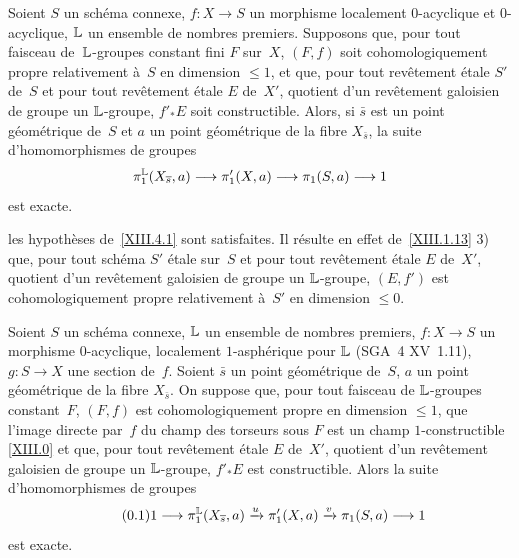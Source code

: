 \begin{lemme}
\label{XIII.4.2}
Soient $S$ un sch\'ema connexe, $f\colon X\to S$ un morphisme
localement $0$-acyclique et $0$-acyclique, $\mathbb{L}$ un ensemble de
nombres premiers. Supposons
que, pour tout faisceau de~$\mathbb{L}$-groupes constant fini $F$ sur~$X$,
$(F,f)$ soit cohomologiquement propre relativement \`a~$S$ en
dimension $\leqslant1$, et que, pour tout rev\^etement \'etale
$S'$ de~$S$ et pour tout rev\^etement \'etale $E$ de~$X'$,
quotient d'un rev\^etement galoisien de groupe un $\mathbb{L}$-groupe,
$f'_*E$ soit constructible. Alors, si $\bar{s}$ est un point
g\'eom\'etrique de~$S$ et $a$ un point g\'eom\'etrique de la
fibre $X_{\bar{s}}$, la suite d'homomorphismes de groupes
$$
\pi_1^{\LL}(X_{\bar{s}},a)\to\pi_1'(X,a)\to\pi_1(S,a)\to1
$$
est exacte.
\end{lemme}

les hypoth\`eses de~\ref{XIII.4.1} sont satisfaites. Il r\'esulte
en effet de~\ref{XIII.1.13} 3) que, pour tout sch\'ema $S'$
\'etale sur~$S$ et pour tout rev\^etement \'etale $E$ de~$X'$,
quotient d'un rev\^etement galoisien de groupe un $\mathbb{L}$-groupe,
$(E,f')$ est cohomologiquement propre relativement \`a~$S'$ en
dimension $\leqslant 0$.
\begin{proposition}
\label{XIII.4.3}
Soient $S$ un sch\'ema connexe, $\mathbb{L}$ un ensemble de nombres
premiers, $f\colon X\to S$ un morphisme $0$-acyclique, localement
$1$-asph\'erique pour $\mathbb{L}$ \textup{(SGA~4 XV~1.11)}, $g\colon S\to X$ une
section de~$f$. Soient $\bar{s}$ un point g\'eom\'etrique de~$S$,
$a$ un point g\'eom\'etrique de la fibre $X_{\bar{s}}$. On suppose
que, pour tout faisceau de
$\mathbb{L}$-groupes
constant~$F$, $(F,f)$ est cohomologiquement propre en dimension
$\leqslant1$, que l'image directe par~$f$ du champ des torseurs sous
$F$ est un champ $1$-constructible \eqref{XIII.0} et que, pour tout
rev\^etement \'etale $E$ de~$X'$, quotient d'un rev\^etement
galoisien de groupe un $\mathbb{L}$-groupe, $f'_*E$ est constructible. Alors
la suite d'homomorphismes de groupes
\begin{equation*}
\label{eq:XIII.4.3.1}
\tag{\thesubsection.1}
1\to\pi_1^{\LL}(X_{\bar{s}},a)\lto{u} \pi_1'(X,a)\lto{v}\pi_1(S,a)\to1
\end{equation*}
est exacte.
\end{proposition}


